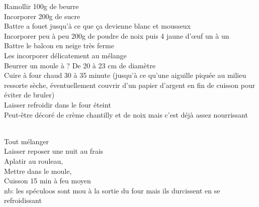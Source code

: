 \begin{minipage}[c]{\textwidth}
Ramollir 100g de beurre\\
Incorporer 200g de sucre\\
Battre a fouet jusqu'à ce que ça devienne blanc et mousseux\\
Incorporer peu à peu 200g de poudre de noix puis 4 jaune d'œuf un à un\\
Battre le balcon en neige très ferme\\
Les incorporer délicatement au mélange\\
Beurrer un moule à ? De 20 à 23 cm de diamètre\\
Cuire à four chaud 30 à 35 minute (jusqu'à ce qu'une aiguille piquée au milieu ressorte sèche, éventuellement couvrir d'un papier d'argent en fin de cuisson pour éviter de bruler)\\
Laisser refroidir dans le four éteint\\
Peut-être décoré de crème chantilly et de noix mais c'est déjà assez nourrissant\\
\\

\end{minipage}

\begin{minipage}[c]{\textwidth}
Tout mélanger\\
Laisser reposer une nuit au frais\\
Aplatir au rouleau,\\
Mettre dans le moule,\\
Cuisson 15 min à feu moyen\\
nb: les spéculoos sont mou à la sortie du four mais ils durcissent en se refroidissant\\
\\

\end{minipage}

